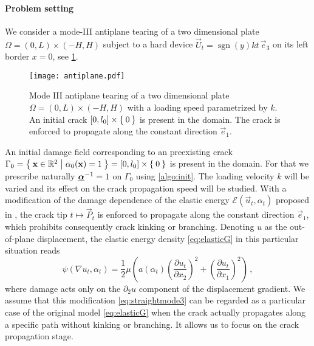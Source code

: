 \paragraph{Problem setting} We consider a mode-\RN{3} antiplane tearing of a two dimensional plate $\Omega=(0,L)\times(-H,H)$ subject to a hard device $\vec{U}_t=\operatorname{sgn}(y)kt\,\vec{e}_3$ on its left border $x=0$, see \cref{fig:antiplane}.
\begin{figure}[htbp]
\centering
\texttt{[image: antiplane.pdf]}
\caption{Mode III antiplane tearing of a two dimensional plate $\Omega=(0,L)\times(-H,H)$ with a loading speed parametrized by $k$. An initial crack $[0,l_0]\times\Set{0}$ is present in the domain. The crack is enforced to propagate along the constant direction $\vec{e}_1$.} \label{fig:antiplane}
\end{figure}
An initial damage field corresponding to an preexisting crack $\Gamma_0=\set{\vec{x}\in\mathbb{R}^2|\alpha_0(\vec{x})=1}=[0,l_0]\times\set{0}$ is present in the domain. For that we prescribe naturally $\dvec^{-1}=1$ on $\Gamma_0$ using \cref{algo:init}. The loading velocity $k$ will be varied and its effect on the crack propagation speed will be studied. With a modification of the damage dependence of the elastic energy $\mathcal{E}(\vec{u}_t,\alpha_t)$ proposed in \cite{Bourdin:2011}, the crack tip $t\mapsto\vec{P}_t$ is enforced to propagate along the constant direction $\vec{e}_1$, which prohibits consequently crack kinking or branching. Denoting $u$ as the out-of-plane displacement, the elastic energy density \eqref{eq:elasticG} in this particular situation reads
\begin{equation} \label{eq:straightmode3}
\psi(\nabla u_t,\alpha_t)=\frac{1}{2}\mu\left(a(\alpha_t)\left(\frac{\partial u_t}{\partial x_2}\right)^2+\left(\frac{\partial u_t}{\partial x_1}\right)^2\right)\,,
\end{equation}
where damage acts only on the $\partial_2 u$ component of the displacement gradient. We assume that this modification \eqref{eq:straightmode3} can be regarded as a particular case of the original model \eqref{eq:elasticG} when the crack actually propagates along a specific path without kinking or branching. It allows us to focus on the crack propagation stage.


